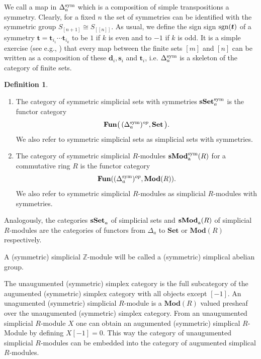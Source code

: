 \documentclass[12pt]{amsart}
\theoremstyle{plain}
\numberwithin{lemma}{\DefaultNumberTheoremWithin}
\numberwithin{claim}{\DefaultNumberTheoremWithin}
\numberwithin{theorem}{\DefaultNumberTheoremWithin}
\numberwithin{corollary}{\DefaultNumberTheoremWithin}
\numberwithin{proposition}{\DefaultNumberTheoremWithin}
\numberwithin{conjecture}{\DefaultNumberTheoremWithin}
\theoremstyle{definition}
\newtheorem*{definition}{Definition}
\theoremstyle{definition}
\numberwithin{question}{\DefaultNumberTheoremWithin}
\theoremstyle{definition}
\numberwithin{problem}{\DefaultNumberTheoremWithin}
\theoremstyle{remark}
\numberwithin{remark}{\DefaultNumberTheoremWithin}
\theoremstyle{remark}
\numberwithin{example}{\DefaultNumberTheoremWithin}
\def\sgn{\textnormal{sgn}}
\def\Dsym{\Delta^{\textnormal{sym}}_a}
\def\bd{\boldsymbol d}
\def\bs{\boldsymbol s}
\def\bt{\boldsymbol t}
\newcommand{\Mod}[1]{\mathbf{Mod}(#1)}
\newcommand{\sMod}[2]{\mathbf{sMod}_\textnormal{a}^{\textnormal{#1}}(#2)}  %
\newcommand{\sSet}[1]{\mathbf{sSet}_a^\textnormal{#1}} %
\newcommand{\Sym}[1]{S_{[#1]}}
\newcommand{\firstappearence}[1]{{\sf #1}}
\begin{document}
\bigskip 


We call a map in $\Dsym$ which is a composition of simple transpositions a \firstappearence{symmetry}. Clearly, for a fixed $n$ the set of
symmetries can be identified with the symmetric group 
$\Sym{n+1} \cong \Sym{[n]}$. As usual, we define the sign \firstappearence{sign} $\sgn(\bt)$ of a symmetry $\bt=\bt_{i_1}\cdots \bt_{i_k}$ to be $1$ if $k$ is even and to $-1$ if $k$ is odd.
It is a simple exercise (see e.g., \cite{Grandis}) 
 that every map between the finite sets $[m]$ and $[n]$ can be written as a composition of these $\bd_i,\bs_i$ and $\bt_i$, i.e. $\Dsym$ is a skeleton of the category of finite sets.



\begin{definition}~
\begin{enumerate}
    \item The \firstappearence{category of symmetric simplicial sets with symmetries} $\sSet{sym}$ is the functor category $$\mathbf{Fun}\big(\,(\Dsym)^{op},\mathbf{Set}\,\big).$$ 
    We also refer to symmetric simplicial sets as \firstappearence{simplicial sets with symmetries}.
    \item The \firstappearence{category of symmetric simplicial $R$-mod\-ules} $\sMod{sym}{R}$ for a commutative ring $R$ is the functor category $$\mathbf{Fun}((\Dsym)^{op},\mathbf{Mod}(R)).$$ We also refer to symmetric simplicial $R$-mod\-ules as \firstappearence{simplicial $R$-modules with sym\-me\-tries}.
\end{enumerate}

Analogously, the categories $\sSet{}$ of simplicial sets and 
$\sMod{}{R}$ of simplicial $R$-modules are the categories of functors
from $\Delta_a$ to $\mathbf{Set}$ or $\mathbf{Mod}(R)$ respectively.

A (symmetric) simplicial $\mathbb{Z}$-module will be called a \firstappearence{(symmetric) simplical abelian group}.
\end{definition}


\medskip
 The \firstappearence{unaugumented (symmetric) simplex category} is the full subcategory of the augumented (symmetric) simplex category with all objects except $[-1]$. An unagumented (symmetric) simplicial $R$-module is a $\Mod{R}$ valued presheaf over the unaugumented (symmetric) simplex category. 
 From an unaugumented simplicial $R$-module $X$ one can obtain an au\-gu\-men\-ted (symmetric) simplical $R$-Module by defining $X[-1]=0$. This way the category of unaugumented simplicial $R$-modules can be embedded into the category of augumented simplical $R$-modules.
\end{document}
